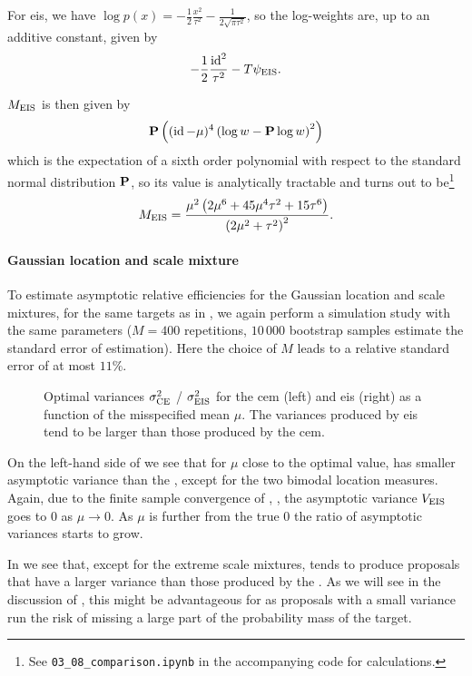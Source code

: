 \begin{example}
    For \acrshort{eis}, we have $\log p(x) = -\frac{1}{2} \frac{x^{2}}{\tau^{2}} - \frac{1}{2\sqrt{\pi\tau^{2}}}$, so the log-weights are, up to an additive constant, given by
    $$
        - \frac{1}{2} \frac{\id^{2}}{\tau^{2}} - T \psi_{\eis}.
    $$

    $M_{\eis}$ is then given by 
    $$
        \P \left( (\id - \mu)^{4} \left( \log w - \P \log w \right)^{2}  \right)
    $$
    which is the expectation of a sixth order polynomial with respect to the standard normal distribution $\P$, so its value is analytically tractable and turns out to be\footnote{See \texttt{03\_08\_comparison.ipynb} in the accompanying code for calculations.}
    $$ M_{\eis} = \frac{\mu^{2} \left(2 \mu^{6} + 45 \mu^{4} \tau^{2} + 15 \tau^{6}\right)}{\left(2 \mu^{2} + \tau^{2}\right)^{2}}.
    $$

    \paragraph{Gaussian location and scale mixture}
    To estimate asymptotic relative efficiencies for the Gaussian location and scale mixtures, for the same targets as in , we again perform a simulation study with the same parameters ($M = 400 $ repetitions, $10\,000$ bootstrap samples estimate the standard error of estimation).
    Here the choice of $M$ leads to a relative standard error of at most $11\%$. 
\end{example}
\begin{figure}
    \centering

    \resizebox{\textwidth}{!}{%
    }
    \caption{Optimal variances $\sigma^{2}_{\ce}$ / $\sigma^{2}_\eis$ for the \acrshort{cem} (left) and \acrshort{eis} (right) as a function of the misspecified mean $\mu$. The variances produced by \acrshort{eis} tend to be larger than those produced by the \acrshort{cem}.}
    \label{fig:cem_eis_sigma2}
\end{figure}

On the left-hand side of  we see that for $\mu$ close to the optimal value, \aeis has smaller asymptotic variance than the \acem, except for the two bimodal location measures. Again, due to the finite sample convergence of \aeis, , the asymptotic variance $V_{\eis}$ goes to $0$ as $\mu \to 0$. As $\mu$ is further from the true $0$ the ratio of asymptotic variances starts to grow. 

In  we see that, except for the extreme scale mixtures, \aeis tends to produce proposals that have a larger variance than those produced by the \acem. As we will see in the discussion of , this might be advantageous for \aeis as proposals with a small variance run the risk of missing a large part of the probability mass of the target. 

